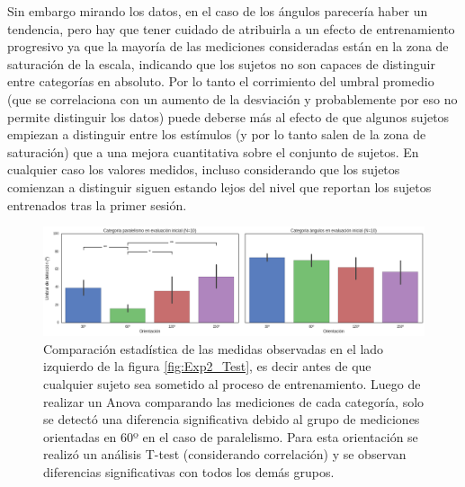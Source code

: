 \documentclass{article}
\numberwithin{figure}{section}
\begin{document}
    Sin embargo mirando los datos, en el caso de los ángulos parecería haber un tendencia, pero hay que tener cuidado de atribuirla a un efecto de entrenamiento progresivo ya que la mayoría de las mediciones consideradas están en la zona de saturación de la escala, indicando que los sujetos no son capaces de distinguir entre categorías en absoluto. Por lo tanto el corrimiento del umbral promedio (que se correlaciona con un aumento de la desviación y probablemente por eso no permite distinguir los datos) puede deberse más al efecto de que algunos sujetos empiezan a distinguir entre los estímulos (y por lo tanto salen de la zona de saturación) que a una mejora cuantitativa sobre el conjunto de sujetos. En cualquier caso los valores medidos, incluso considerando que los sujetos comienzan a distinguir siguen estando lejos del nivel que reportan los sujetos entrenados tras la primer sesión. 
    

    \begin{figure}
        \center
        \includegraphics[width=\textwidth]{Imagenes/TransferenciaInicialMedias.png}
        \caption{Comparación estadística de las medidas observadas en el lado izquierdo de la figura \ref{fig:Exp2_Test}, es decir antes de que cualquier sujeto sea sometido al proceso de entrenamiento. Luego de realizar un Anova comparando las mediciones de cada categoría, solo se detectó una diferencia significativa debido al grupo de mediciones orientadas en 60º en el caso de paralelismo. Para esta orientación se realizó un análisis T-test (considerando correlación) y se observan diferencias significativas con todos los demás grupos.}
        \label{fig:Exp2_SignificanciaInicial}
    \end{figure}  
    
\end{document}
